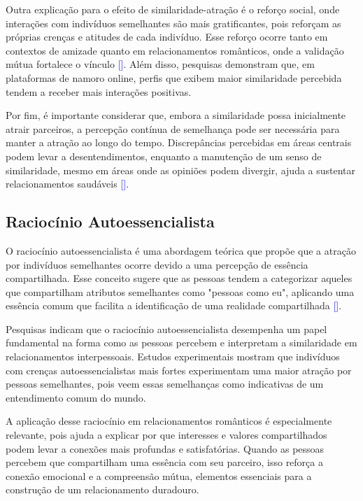 Outra explicação para o efeito de similaridade-atração é o reforço social, onde interações com indivíduos semelhantes são mais gratificantes, pois reforçam as próprias crenças e atitudes de cada indivíduo. Esse reforço ocorre tanto em contextos de amizade quanto em relacionamentos românticos, onde a validação mútua fortalece o vínculo \textcolor{blue}{[\cite{Byrne1971}]}. Além disso, pesquisas demonstram que, em plataformas de namoro online, perfis que exibem maior similaridade percebida tendem a receber mais interações positivas.

Por fim, é importante considerar que, embora a similaridade possa inicialmente atrair parceiros, a percepção contínua de semelhança pode ser necessária para manter a atração ao longo do tempo. Discrepâncias percebidas em áreas centrais podem levar a desentendimentos, enquanto a manutenção de um senso de similaridade, mesmo em áreas onde as opiniões podem divergir, ajuda a sustentar relacionamentos saudáveis \textcolor{blue}{[\cite{Montoya2008}]}.

\subsection{Raciocínio Autoessencialista}
O raciocínio autoessencialista é uma abordagem teórica que propõe que a atração por indivíduos semelhantes ocorre devido a uma percepção de essência compartilhada. Esse conceito sugere que as pessoas tendem a categorizar aqueles que compartilham atributos semelhantes como "pessoas como eu", aplicando uma essência comum que facilita a identificação de uma realidade compartilhada \textcolor{blue}{[\cite{Chu2023}]}.

Pesquisas indicam que o raciocínio autoessencialista desempenha um papel fundamental na forma como as pessoas percebem e interpretam a similaridade em relacionamentos interpessoais. Estudos experimentais mostram que indivíduos com crenças autoessencialistas mais fortes experimentam uma maior atração por pessoas semelhantes, pois veem essas semelhanças como indicativas de um entendimento comum do mundo.

A aplicação desse raciocínio em relacionamentos românticos é especialmente relevante, pois ajuda a explicar por que interesses e valores compartilhados podem levar a conexões mais profundas e satisfatórias. Quando as pessoas percebem que compartilham uma essência com seu parceiro, isso reforça a conexão emocional e a compreensão mútua, elementos essenciais para a construção de um relacionamento duradouro.

